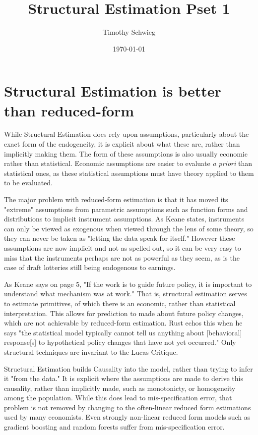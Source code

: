 \documentclass[12pt, letterpaper]{paper}
\author{Timothy Schwieg}
\date{\today}
\title{Structural Estimation Pset 1}
\begin{document}
\maketitle

\section{Structural Estimation is better than reduced-form}
\label{sec:orga04345e}
While Structural Estimation does rely upon assumptions, particularly
about the exact form of the endogeneity, it is explicit about what
these are, rather than implicitly making them. The form of these
assumptions is also usually economic rather than statistical. Economic
assumptions are easier to evaluate \emph{a priori} than statistical ones,
as these statistical assumptions must have theory applied to them to
be evaluated. 

The major problem with reduced-form estimation is that it has moved
its "extreme" assumptions from parametric assumptions such as function
forms and distributions to implicit instrument assumptions. As Keane
states, instruments can only be viewed as exogenous when viewed
through the lens of some theory, so they can never be taken as
"letting the data speak for itself." However these assumptions are now
implicit and not as spelled out, so it can be very easy to miss that
the instruments perhaps are not as powerful as they seem, as is the
case of draft lotteries still being endogenous to earnings. 

As Keane says on page 5, "If the work is to guide future policy, it is
important to understand what mechanism was at work." That is,
structural estimation serves to estimate primitives, of which there is
an economic, rather than statistical interpretation. This allows for
prediction to made about future policy changes, which are not
achievable by reduced-form estimation. Rust echos this when he says
"the statistical model typically cannot tell us anything about
[behavioral] response[s] to hypothetical policy changes that have not
yet occurred." Only structural techniques are invariant to the Lucas
Critique.

Structural Estimation builds Causality into the model, rather than
trying to infer it "from the data." It is explicit where the
assumptions are made to derive this causality, rather than implicitly
made, such as monotonicty, or homogeneity among the
population. While this does lead to mis-specification error, that
problem is not removed by changing to the often-linear reduced form
estimations used by many economists. Even strongly non-linear reduced
form models such as gradient boosting and random forests suffer from
mis-specification error. 
\end{document}
